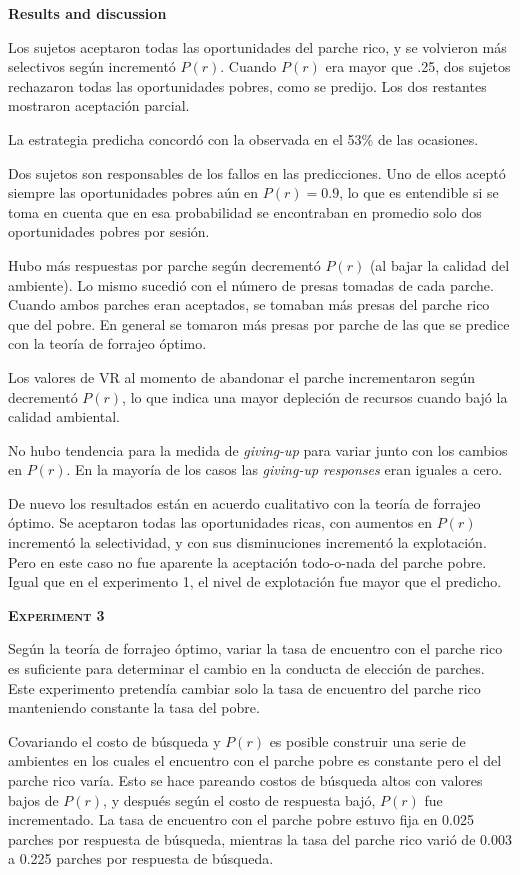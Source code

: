 \documentclass[a4paper,12pt]{article}
\begin{document}
{\bfseries Results and discussion}

Los sujetos aceptaron todas las oportunidades del parche rico, y se volvieron más selectivos según incrementó $P(r)$. Cuando $P(r)$ era mayor que .25, dos sujetos rechazaron todas las oportunidades pobres, como se predijo. Los dos restantes mostraron aceptación parcial.

La estrategia predicha concordó con la observada en el 53\% de las ocasiones.

Dos sujetos son responsables de los fallos en las predicciones. Uno de ellos aceptó siempre las oportunidades pobres aún en $P(r) = 0{.}9$, lo que es entendible si se toma en cuenta que en esa probabilidad se encontraban en promedio solo dos oportunidades pobres por sesión.

Hubo más respuestas por parche según decrementó $P(r)$ (al bajar la calidad del ambiente). Lo mismo sucedió con el número de presas tomadas de cada parche. Cuando ambos parches eran aceptados, se tomaban más presas del parche rico que del pobre. En general se tomaron más presas por parche de las que se predice con la teoría de forrajeo óptimo.

Los valores de VR al momento de abandonar el parche incrementaron según decrementó $P(r)$, lo que indica una mayor depleción de recursos cuando bajó la calidad ambiental.

No hubo tendencia para la medida de {\itshape giving-up} para variar junto con los cambios en $P(r)$. En la mayoría de los casos las {\itshape giving-up responses} eran iguales a cero.

De nuevo los resultados están en acuerdo cualitativo con la teoría de forrajeo óptimo. Se aceptaron todas las oportunidades ricas, con aumentos en $P(r)$ incrementó la selectividad, y con sus disminuciones incrementó la explotación. Pero en este caso no fue aparente la aceptación todo-o-nada del parche pobre. Igual que en el experimento 1, el nivel de explotación fue mayor que el predicho.

{\scshape\bfseries Experiment 3}

Según la teoría de forrajeo óptimo, variar la tasa de encuentro con el parche rico es suficiente para determinar el cambio en la conducta de elección de parches. Este experimento pretendía cambiar solo la tasa de encuentro del parche rico manteniendo constante la tasa del pobre.

Covariando el costo de búsqueda y $P(r)$ es posible construir una serie de ambientes en los cuales el encuentro con el parche pobre es constante pero el del parche rico varía. Esto se hace pareando costos de búsqueda altos con valores bajos de $P(r)$, y después según el costo de respuesta bajó, $P(r)$ fue incrementado. La tasa de encuentro con el parche pobre estuvo fija en 0.025 parches por respuesta de búsqueda, mientras la tasa del parche rico varió de 0.003 a 0.225 parches por respuesta de búsqueda.
\end{document}
